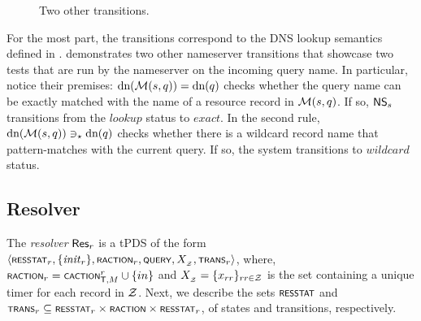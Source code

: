 \begin{figure}
	\centering
	\captionsetup{skip=4pt}
	\caption{\label{fig:ns-transitions-more}Two other transitions.}
 \vspace{-2ex}
\end{figure}

For the most part, the transitions correspond to the DNS lookup semantics defined in \cite[Figure 3]{groot}.    demonstrates two other nameserver transitions that showcase two tests that are run by the nameserver on the incoming query name. In particular, notice their premises: $\text{dn}(\cal M (s,q)) = \text{dn}(q)$ checks whether the query name can be exactly matched with the name of a resource record in $\cal M (s,q)$. If so, $\ns{s}$ transitions from the $\mathit{lookup}$ status to $\mathit{exact}$. In the second rule,  $\text{dn}(\cal M (s,q)) \ni_\star \text{dn}(q)$ checks whether there is a wildcard record name that pattern-matches with the current query. If so, the system transitions to $\mathit{wildcard}$ status.




\subsection{Resolver}\label{subsec:RR-semantics}

The \emph{resolver} $\rec{r}$ is a tPDS of the form $\tup{\scrsf{resstat}_r, \{\mathit{init}_r\}, \scrsf{raction}_r, \scrsf{query}, X\subsub{\cal Z}, \trans_r}$, where, $\scrsf{raction}_r = \scrsf{caction}^r_{\mathsf T, M} \cup \{in\}$ and $X\subsub{\cal Z} = \{x_{rr}\}_{rr \in \cal Z}$ is the set containing a unique timer for each record in $\cal Z$. Next, we describe the sets $\scrsf{resstat}$ and $\trans_r \subseteq \scrsf{resstat}_r \times \scrsf{raction} \times \scrsf{resstat}_r$, of states and transitions, respectively.



